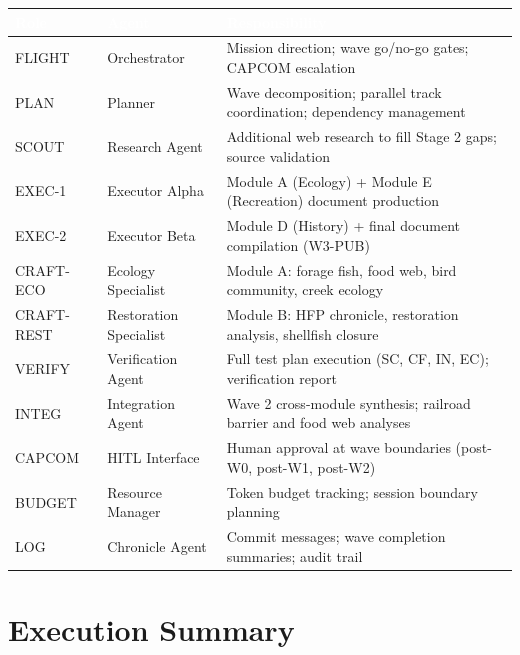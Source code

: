 \documentclass[11pt,letterpaper]{article}
\newcommand{\tableheader}[1]{\textbf{\sffamily\textcolor{white}{#1}}}
\begin{document}
\begin{center}
\begin{tabularx}{\textwidth}{L{2cm}L{2.5cm}X}
\toprule
{}
\tableheader{Role} & \tableheader{Agent} & \tableheader{Responsibility} \\
\midrule
FLIGHT & Orchestrator & Mission direction; wave go/no-go gates; CAPCOM escalation \\
PLAN & Planner & Wave decomposition; parallel track coordination; dependency management \\
SCOUT & Research Agent & Additional web research to fill Stage 2 gaps; source validation \\
EXEC-1 & Executor Alpha & Module A (Ecology) + Module E (Recreation) document production \\
EXEC-2 & Executor Beta & Module D (History) + final document compilation (W3-PUB) \\
CRAFT-ECO & Ecology Specialist & Module A: forage fish, food web, bird community, creek ecology \\
CRAFT-REST & Restoration Specialist & Module B: HFP chronicle, restoration analysis, shellfish closure \\
VERIFY & Verification Agent & Full test plan execution (SC, CF, IN, EC); verification report \\
INTEG & Integration Agent & Wave 2 cross-module synthesis; railroad barrier and food web analyses \\
CAPCOM & HITL Interface & Human approval at wave boundaries (post-W0, post-W1, post-W2) \\
BUDGET & Resource Manager & Token budget tracking; session boundary planning \\
LOG & Chronicle Agent & Commit messages; wave completion summaries; audit trail \\
\bottomrule
\end{tabularx}
\end{center}

\section{Execution Summary}
\end{document}
